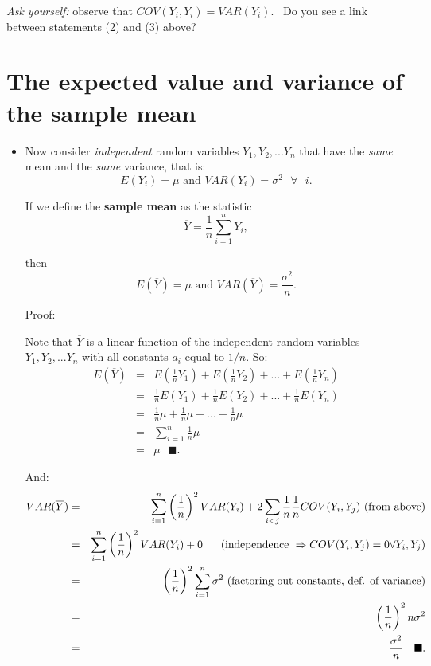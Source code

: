 \documentclass[11pt]{article}
\begin{document}
\textit{Ask yourself:} observe that $COV(Y_{i},Y_{i})=VAR(Y_{i})$. \ Do you
see a link between statements (2) and (3) above?\bigskip

\section{The expected value and variance of the sample mean\protect\bigskip}

\begin{itemize}
\item Now consider \textit{independent} random variables $%
Y_{1},Y_{2},...Y_{n}$ that have the \textit{same }mean and the \textit{same }%
variance, that is:%
\begin{equation*}
E(Y_{i})=\mu \text{ and }VAR(Y_{i})=\sigma ^{2}\text{ }\forall \text{ }i.
\end{equation*}

If we define the \textbf{sample mean} as the statistic%
\begin{equation*}
\overline{Y}=\frac{1}{n}\sum_{i=1}^{n}Y_{i},
\end{equation*}

then%
\begin{equation*}
E(\overline{Y})=\mu \text{ and }VAR(\overline{Y})=\frac{\sigma ^{2}}{n}.
\end{equation*}%
\newpage

Proof:

Note that $\overline{Y}$ is a linear function of the independent random
variables $Y_{1},Y_{2},...Y_{n}$ with all constants $a_{i}$ equal to $1/n.$
So:%
\begin{eqnarray*}
E(\overline{Y}) &=&E\left( \frac{1}{n}Y_{1}\right) +E\left( \frac{1}{n}%
Y_{2}\right) +...+E\left( \frac{1}{n}Y_{n}\right) \\
&=&\frac{1}{n}E(Y_{1})+\frac{1}{n}E(Y_{2})+...+\frac{1}{n}E(Y_{n}) \\
&=&\frac{1}{n}\mu +\frac{1}{n}\mu +...+\frac{1}{n}\mu \\
&=&\sum_{i=1}^{n}\frac{1}{n}\mu \\
&=&\mu \text{ \ \ }\blacksquare .
\end{eqnarray*}%
\bigskip

And:%
\begin{eqnarray*}
VAR(\overline{Y}) &=&\sum_{i=1}^{n}\left( \frac{1}{n}\right)
^{2}VAR(Y_{i})+2\sum_{i<j}\frac{1}{n}\frac{1}{n}COV(Y_{i},Y_{j})\text{ (from
above)} \\
&=&\sum_{i=1}^{n}\left( \frac{1}{n}\right) ^{2}VAR(Y_{i})+0\text{ \ \ \ \
(independence }\Rightarrow COV(Y_{i},Y_{j})=0\forall Y_{i},Y_{j}\text{)} \\
&=&\left( \frac{1}{n}\right) ^{2}\sum_{i=1}^{n}\sigma ^{2}\text{ (factoring
out constants, def. of variance)} \\
&=&\left( \frac{1}{n}\right) ^{2}n\sigma ^{2} \\
&=&\frac{\sigma ^{2}}{n}\text{ \ \ }\blacksquare .
\end{eqnarray*}
\end{itemize}
\end{document}
